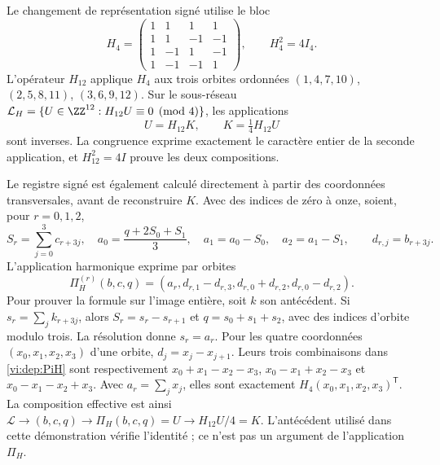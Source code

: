 Le changement de représentation signé utilise le bloc
\begin{equation}
 H_4=\begin{pmatrix}
 1&1&1&1\\1&1&-1&-1\\
 1&-1&1&-1\\1&-1&-1&1
 \end{pmatrix},\qquad H_4^2=4I_4.
 \label{vi:dep:hadamard}
\end{equation}
L’opérateur \(H_{12}\) applique \(H_4\) aux trois orbites ordonnées
\((1,4,7,10)\), \((2,5,8,11)\), \((3,6,9,12)\).
Sur le sous-réseau
\(\mathcal L_H=\{U\in\ZZ^{12}:H_{12}U\equiv0\pmod4\}\),
les applications
\begin{equation}
 U=H_{12}K,\qquad K=\tfrac14H_{12}U
 \label{vi:dep:K-reversible}
\end{equation}
sont inverses. La congruence exprime exactement le caractère entier de la
seconde application, et \(H_{12}^2=4I\) prouve les deux compositions.

Le registre signé est également calculé directement à partir des coordonnées
transversales, avant de reconstruire \(K\). Avec des indices de zéro à onze,
soient, pour \(r=0,1,2\),
\[
 S_r=\sum_{j=0}^3c_{r+3j},\quad
 a_0=\frac{q+2S_0+S_1}{3},\quad
 a_1=a_0-S_0,\quad a_2=a_1-S_1,
 \qquad d_{r,j}=b_{r+3j}.
\]
L’application harmonique exprime par orbites
\begin{equation}
 \Pi_H^{(r)}(b,c,q)=
 (a_r,d_{r,1}-d_{r,3},d_{r,0}+d_{r,2},d_{r,0}-d_{r,2}).
 \label{vi:dep:PiH}
\end{equation}
Pour prouver la formule sur l’image entière, soit \(k\) son
antécédent. Si \(s_r=\sum_jk_{r+3j}\), alors
\(S_r=s_r-s_{r+1}\) et \(q=s_0+s_1+s_2\), avec des indices d’orbite
modulo trois. La résolution donne \(s_r=a_r\). Pour les quatre coordonnées
\((x_0,x_1,x_2,x_3)\) d’une orbite,
\(d_j=x_j-x_{j+1}\). Leurs trois combinaisons dans
\eqref{vi:dep:PiH} sont respectivement
\(x_0+x_1-x_2-x_3\), \(x_0-x_1+x_2-x_3\) et
\(x_0-x_1-x_2+x_3\). Avec \(a_r=\sum_jx_j\), elles sont
exactement \(H_4(x_0,x_1,x_2,x_3)^{\mathsf T}\).
La composition effective est ainsi
\(\mathscr L\to(b,c,q)\to\Pi_H(b,c,q)=U\to H_{12}U/4=K\).
L’antécédent utilisé dans cette démonstration vérifie l’identité ;
ce n’est pas un argument de l’application \(\Pi_H\).

